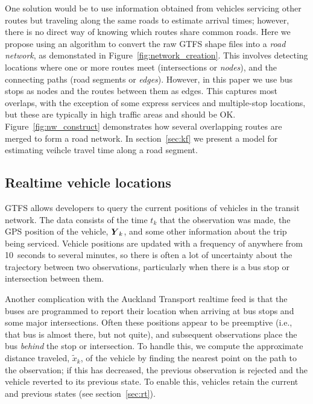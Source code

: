 One solution would be to use information obtained from
vehicles servicing other routes but traveling along the same roads
to estimate arrival times;
however, there is no direct way of knowing which routes share common roads.
Here we propose using an algorithm to convert the raw GTFS shape files
into a \emph{road network},
as demonstated in Figure~\ref{fig:network_creation}.
This involves detecting locations where one or more routes meet 
(intersections or \emph{nodes}),
and the connecting paths (road segments or \emph{edges}).
However, in this paper we use bus stops as nodes and the routes between them as edges.
This captures most overlaps, 
with the exception of some express services and multiple-stop locations,
but these are typically in high traffic areas and should be OK.
Figure~\ref{fig:nw_construct} demonstrates how several overlapping routes 
are merged to form a road network.
In section~\ref{sec:kf} we present a model for estimating veihcle travel time
along a road segment.



\subsection{Realtime vehicle locations}
\label{sec:realtime_data}

GTFS \rt allows developers to query the current positions of vehicles
in the transit network.
The data consists of the time $t_k$ that the observation was made,
the GPS position of the vehicle, $\mbox{$\boldsymbol{Y}$}_k$, 
and some other information about the trip being serviced.
Vehicle positions are updated with a frequency of anywhere from 10~seconds to several minutes,
so there is often a lot of uncertainty about the trajectory
between two observations, particularly when there is a bus stop
or intersection between them.

Another complication with the Auckland Transport realtime feed is that
the buses are programmed to report their location when arriving at
bus stops and some major intersections.
Often these positions appear to be preemptive (i.e., that bus is almost there, 
but not quite),
and subsequent observations place the bus \emph{behind} the stop or intersection.
To handle this, we compute the approximate distance traveled, $\tilde x_k$,
of the vehicle by finding the nearest point on the path to the observation;
if this has decreased, the previous observation is rejected and the vehicle reverted
to its previous state.
To enable this, vehicles retain the current and previous states (see section~\ref{sec:rt}).
